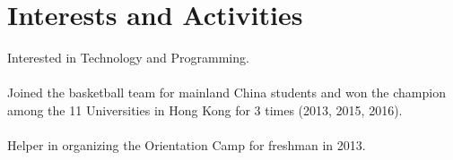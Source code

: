 \documentclass[a4paper,8pt]{article} %
\begin{document}

\section{Interests and Activities}

Interested in Technology and Programming. \\ \\
Joined the basketball team for mainland China students and won the champion among the 11 Universities in Hong Kong for 3 times (2013, 2015, 2016).\\ \\
Helper in organizing the Orientation Camp for freshman in 2013. 




\end{document}
